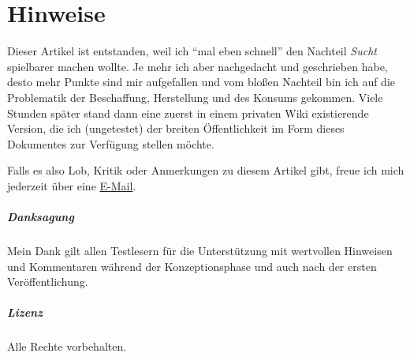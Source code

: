\clearpage
{}
\printbibliography[title = {Quellen}, heading=bibnumbered]
\clearpage

\chapter{Hinweise}
Dieser Artikel ist entstanden, weil ich \enquote{mal eben schnell} den Nachteil \emph{Sucht} spielbarer machen wollte. Je mehr ich aber nachgedacht und geschrieben habe, desto mehr Punkte sind mir aufgefallen und vom bloßen Nachteil bin ich auf die Problematik der Beschaffung, Herstellung und des Konsums gekommen. Viele Stunden später stand dann eine zuerst in einem privaten Wiki existierende Version, die ich (ungetestet) der breiten Öffentlichkeit im Form dieses Dokumentes zur Verfügung stellen möchte.

Falls es also Lob, Kritik oder Anmerkungen zu diesem Artikel gibt, freue ich mich jederzeit über eine \href{https://kreuvf.de/impressum.php}{E-Mail}.

\paragraph{Danksagung}
Mein Dank gilt allen Testlesern für die Unterstützung mit wertvollen Hinweisen und Kommentaren während der Konzeptionsphase und auch nach der ersten Veröffentlichung.

\paragraph{Lizenz}
Alle Rechte vorbehalten.

